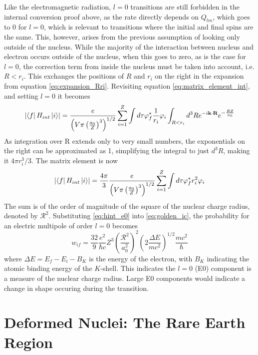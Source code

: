 Like the electromagnetic radiation, $l=0$ transitions are still forbidden in the internal conversion proof above, as the rate directly depends on $Q_{lm}$, which goes to 0 for $l=0$, which is relevant to transitions where the initial and final spins are the same. This, however, arises from the previous assumption of looking only outside of the nucleus. While the majority of the interaction between nucleus and electron occurs outside of the nucleus, when this goes to zero, as is the case for $l=0$, the correction term from inside the nucleus must be taken into account, i.e. $R<r_i$. This exchanges the positions of $R$ and $r_i$ on the right in the expansion from equation \ref{eq:expansion_Rri}. Revisiting equation \ref{eq:matrix_element_int}, and setting $l=0$ it becomes
\begin{equation}
\label{eq:matrix_element_E0}
    \abs{\bra{f}H_{int}\ket{i}} = \frac{e}{\left(V\pi\left(\frac{a_0}{Z}\right)^3\right)^{1/2}}\sum_{i=1}^Z \int d\tau\varphi_{f}^*\frac{1}{r_i}\varphi_{i} \int_{R<r_i}d^3R e^{-i\textbf{k}\cdot\textbf{R}} e^{-\frac{RZ}{a_0}}
\end{equation}
As integration over R extends only to very small numbers, the exponentials on the right can be approximated as 1, simplifying the integral to just $d^3R$, making it $4\pi r_i^3/3$. The matrix element is now
\begin{equation}
\label{eq:hint_e0}
    \abs{\bra{f}H_{int}\ket{i}} =  \frac{4\pi}{3}\frac{e}{\left(V\pi\left(\frac{a_0}{Z}\right)^3\right)^{1/2}} \sum_{i=1}^Z \int d\tau\varphi_{f}^*r_i^2\varphi_{i}
\end{equation}
The sum is of the order of magnitude of the square of the nuclear charge radius, denoted by $\mathcal{R}^2$. Substituting \ref{eq:hint_e0} into \ref{eq:golden_ic}, the probability for an electric multipole of order $l=0$ becomes
\begin{equation}
    w_{if} = \frac{32}{9}\frac{e^2}{\hbar c}Z^3\left(\frac{\mathcal{R}^2}{a_0^2}\right)^2\left(2\frac{\Delta E}{mc^2}\right)^{1/2}\frac{mc^2}{\hbar}
\end{equation}
where $\Delta E=E_f-E_i-B_K$ is the energy of the electron, with $B_K$ indicating the atomic binding energy of the $K$-shell. This indicates the $l=0$ (E0) component is a measure of the nuclear charge radius. Large E0 components would indicate a change in shape occuring during the transition. 

\section{Deformed Nuclei: The Rare Earth Region}

